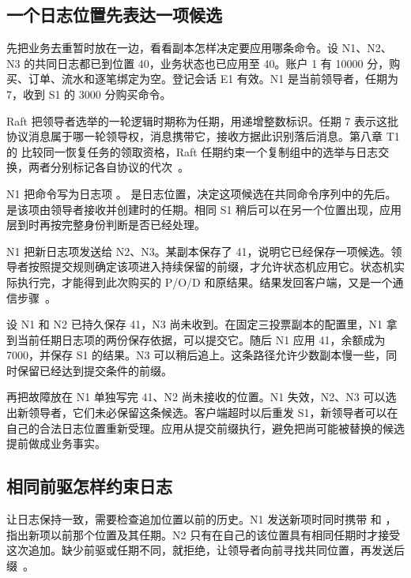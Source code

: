 \subsection*{一个日志位置先表达一项候选}

先把业务去重暂时放在一边，看看副本怎样决定要应用哪条命令。设 N1、N2、N3 的共同日志都已到位置 40，业务状态也已应用至 40。账户 1 有 10000 分，购买、订单、流水和逐笔绑定为空。登记会话 E1 有效。N1 是当前领导者，任期为 7，收到 S1 的 3000 分购买命令。

Raft 把领导者选举的一轮逻辑时期称为任期，用递增整数标识。任期 7 表示这批协议消息属于哪一轮领导权，消息携带它，接收方据此识别落后消息。第八章 T1 的  比较同一恢复任务的领取资格，Raft 任期约束一个复制组中的选举与日志交换，两者分别标记各自协议的代次~\cite{raft}。

N1 把命令写为日志项 。 是日志位置，决定这项候选在共同命令序列中的先后。 是该项由领导者接收并创建时的任期。相同 S1 稍后可以在另一个位置出现，应用层到时再按完整身份判断是否已经处理。

N1 把新日志项发送给 N2、N3。某副本保存了 41，说明它已经保存一项候选。领导者按照提交规则确定该项进入持续保留的前缀，才允许状态机应用它。状态机实际执行完，才能得到此次购买的 P/O/D 和原结果。结果发回客户端，又是一个通信步骤~\cite{raft}。


设 N1 和 N2 已持久保存 41，N3 尚未收到。在固定三投票副本的配置里，N1 拿到当前任期日志项的两份保存依据，可以提交它。随后 N1 应用 41，余额成为 7000，并保存 S1 的结果。N3 可以稍后追上。这条路径允许少数副本慢一些，同时保留已经达到提交条件的前缀。

再把故障放在 N1 单独写完 41、N2 尚未接收的位置。N1 失效，N2、N3 可以选出新领导者，它们未必保留这条候选。客户端超时以后重发 S1，新领导者可以在自己的合法日志位置重新受理。应用从提交前缀执行，避免把尚可能被替换的候选提前做成业务事实。

\subsection*{相同前驱怎样约束日志}

让日志保持一致，需要检查追加位置以前的历史。N1 发送新项时同时携带  和 ，指出新项以前那个位置及其任期。N2 只有在自己的该位置具有相同任期时才接受这次追加。缺少前驱或任期不同，就拒绝，让领导者向前寻找共同位置，再发送后缀~\cite{raft}。

